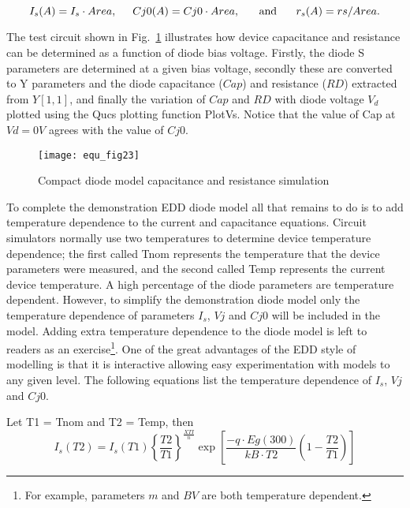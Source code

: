 \begin{equation}
 I_{s}(A)=I_{s} \cdot Area,\hspace{5mm} Cj0(A) = Cj0 \cdot Area, \hspace{5mm}\textrm{ and } \hspace{5mm} r_{s}(A) = rs/Area.
\end{equation} 

The test circuit shown in Fig.~\ref{fig:equ_23} illustrates how device
capacitance and resistance can be determined as a function of diode
bias voltage. Firstly, the diode S parameters are determined at a
given bias voltage, secondly these are converted to Y parameters and
the diode capacitance ($Cap$) and resistance ($RD$) extracted from
$Y[1,1]$, and finally the variation of $Cap$ and $RD$ with diode
voltage $V_{d}$ plotted using the Qucs plotting function
PlotVs. Notice that the value of Cap at $Vd = 0V$ agrees with the
value of $Cj0$.

\begin{figure} 
  \centering
  \texttt{[image: equ\_fig23]}
  \caption{Compact diode model capacitance and resistance simulation} 
  \label{fig:equ_23}
\end{figure} 

\vspace{3mm}

To complete the demonstration EDD diode model all that remains to do
is to add temperature dependence to the current and capacitance
equations. Circuit simulators normally use two temperatures to
determine device temperature dependence; the first called Tnom
represents the temperature that the device parameters were measured,
and the second called Temp represents the current device
temperature. A high percentage of the diode parameters are temperature
dependent. However, to simplify the demonstration diode model only the
temperature dependence of parameters $I_{s}$, $Vj$ and $Cj0$ will be
included in the model. Adding extra temperature dependence to the
diode model is left to readers as an exercise\footnote{For example,
parameters $m$ and $BV$ are both temperature dependent.}.  One of the
great advantages of the EDD style of modelling is that it is
interactive allowing easy experimentation with models to any given
level.  The following equations list the temperature dependence of
$I_{s}$, $Vj$ and $Cj0$.

\vspace{3mm}

Let T1 = Tnom and T2 = Temp, then
\begin{equation}
 I_{s} (T2)=I_{s}(T1) \left\lbrace \dfrac{T2}{T1}\right\rbrace ^{\frac{XTI}{n}} \exp\left[ \dfrac{-q \cdot Eg(300)}{kB \cdot T2}
 \left( 1 - \dfrac{T2}{T1}\right) \right]
 \end{equation} 

